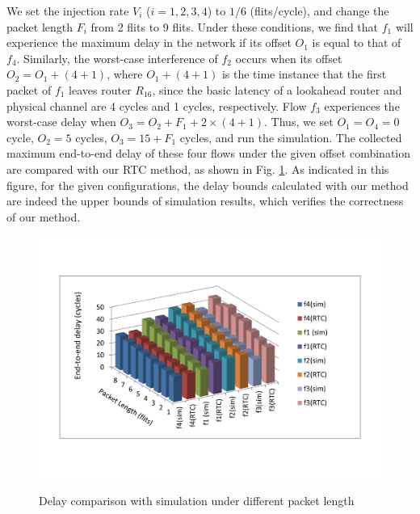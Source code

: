 \documentclass[preprint]{elsarticle}
\begin{document}
We set the injection rate $V_i$ ($i=1,2,3,4$) to $1/6$ (flits/cycle), and change the packet length $F_i$ from 2 flits to 9 flits. Under these conditions, we find that $f_1$ will experience the maximum delay in the network if its offset $O_1$ is equal to that of $f_4$. Similarly, the worst-case interference of $f_2$ occurs when its offset $O_2=O_1+(4+1)$, where $O_1+(4+1)$ is the time instance that the first packet of $f_1$ leaves router $R_{16}$, since the basic latency of a lookahead router and physical channel are 4 cycles and 1 cycles, respectively. Flow $f_3$ experiences the worst-case delay when $O_3=O_2+F_1+2\times(4+1)$. Thus, we set $O_1=O_4=0$ cycle, $O_2=5$ cycles, $O_3=15+F_1$ cycles, and run the simulation. The collected maximum end-to-end delay of these four flows under the given offset combination are compared with our RTC method, as shown in Fig. \ref{rtcvssim}. As indicated in this figure, for the given configurations, the delay bounds calculated with our method are indeed the upper bounds of simulation results, which verifies the correctness of our method.
\begin{figure}
  \centering
  \includegraphics[scale=0.5]{fig10.pdf}\\
  \caption{Delay comparison with simulation under different packet length}\label{rtcvssim}
\end{figure}
\end{document}
